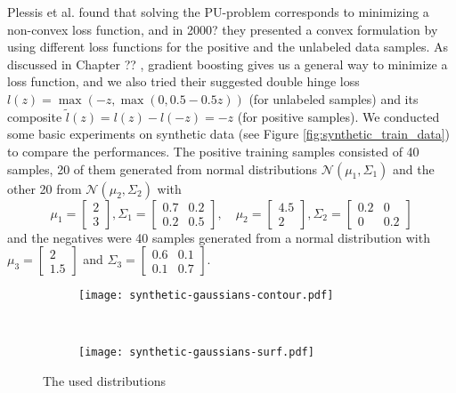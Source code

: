 Plessis et al.  found that solving the PU-problem corresponds to minimizing a non-convex loss function, and in 2000?  they presented a convex formulation by using different loss functions for the positive and the unlabeled data samples. As discussed in Chapter ?? , gradient boosting gives us a general way to minimize a loss function, and we also tried their suggested double hinge loss $l(z) = \max(-z,\max(0,0.5 - 0.5 z))$ (for unlabeled samples) and its composite $\tilde l(z) = l(z) - l(-z) = -z$ (for positive samples). We conducted some basic experiments on synthetic data (see Figure \ref{fig:synthetic_train_data}) to compare the performances. The positive training samples consisted of 40 samples, 20 of them generated from normal distributions $\mathcal{N}(\mu_1,\Sigma_1)$ and the other 20 from $\mathcal{N}(\mu_2, \Sigma_2)$ with 
$$\mu_1= \begin{bmatrix}2 \\ 3 \end{bmatrix}, \Sigma_1 = \begin{bmatrix}0.7 & 0.2 \\ 0.2 & 0.5 \end{bmatrix}, \quad \mu_2 = \begin{bmatrix}4.5 \\ 2 \end{bmatrix}, \Sigma_2 = \begin{bmatrix} 0.2 & 0 \\ 0 & 0.2 \end{bmatrix}$$
and the negatives were 40 samples generated from a normal distribution with $\mu_3 = \begin{bmatrix} 2\\1.5\end{bmatrix}$  and $\Sigma_3 = \begin{bmatrix}0.6 & 0.1\\ 0.1 & 0.7\end{bmatrix}.$


\begin{figure}[ht]
	\centering
	\begin{subfigure}[h]{0.45\textwidth}
	\texttt{[image: synthetic-gaussians-contour.pdf]}	
	\end{subfigure}
	~
	\begin{subfigure}[h]{0.45\textwidth}
	\texttt{[image: synthetic-gaussians-surf.pdf]}	
	\end{subfigure}
	\caption{The used distributions}
	\label{fig:synthetic-gaussians}
\end{figure}

